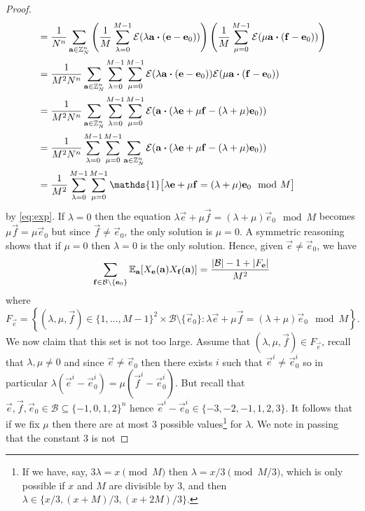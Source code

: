 \begin{proof}
\begin{align*}
	&=\frac{1}{N^{n}}\sum_{\vec{a}\in \mathbb{Z}_{N}^n}
		\left(\frac{1}{M}\sum_{\lambda=0}^{M-1}
			\mathcal{E}(\lambda\vec{a}\dotprod(\vec{e}-\vec{e}_0)
		)\right)
		\left(\frac{1}{M}\sum_{\mu=0}^{M-1}
			\mathcal{E}(\mu\vec{a}\dotprod(\vec{f}-\vec{e}_0)
		)\right)\\
	&=\frac{1}{M^2N^{n}}\sum_{\vec{a}\in \mathbb{Z}_{N}^n}
		\sum_{\lambda=0}^{M-1}\sum_{\mu=0}^{M-1}
			\mathcal{E}(\lambda\vec{a}\dotprod(\vec{e}-\vec{e}_0))
			\mathcal{E}(\mu\vec{a}\dotprod(\vec{f}-\vec{e}_0))\\
	&=\frac{1}{M^2N^{n}}\sum_{\vec{a}\in \mathbb{Z}_{N}^n}
		\sum_{\lambda=0}^{M-1}\sum_{\mu=0}^{M-1}
		\mathcal{E}(\vec{a}\dotprod(\lambda\vec{e}+\mu\vec{f}-(\lambda+\mu)\vec{e}_0))\\
	&=\frac{1}{M^2N^{n}}
		\sum_{\lambda=0}^{M-1}\sum_{\mu=0}^{M-1}
		\sum_{\vec{a}\in \mathbb{Z}_{N}^n}
		\mathcal{E}(\vec{a}\dotprod(\lambda\vec{e}+\mu\vec{f}-(\lambda+\mu)\vec{e}_0))\\
	&=\frac{1}{M^2}
		\sum_{\lambda=0}^{M-1}\sum_{\mu=0}^{M-1}
		\mathds{1}\big[
			\lambda\vec{e}+\mu\vec{f}=(\lambda+\mu)\vec{e}_0\mod{M}
			\big]
\end{align*}
by \eqref{eq:exp}.
If $\lambda=0$ then the equation $\lambda\vec{e}+\mu\vec{f}=(\lambda+\mu)\vec{e}_0\mod{M}$
becomes $\mu\vec{f}=\mu\vec{e}_0$ but since $\vec{f}\neq\vec{e}_0$, the only solution is $\mu=0$.
A symmetric reasoning shows that if $\mu=0$ then $\lambda=0$
is the only solution. Hence, given $\vec{e}\neq\vec{e}_0$, we have
\[
	\sum_{\mathbf{f}\in\mathcal{B}\setminus\{\mathbf{e}_0\}}
		\mathbb{E}_{\mathbf{a}}[X_{\mathbf{e}}(\mathbf{a})X_{\mathbf{f}}(\mathbf{a})]
		=\frac{|\mathcal{B}|-1+|F_{\mathbf{e}}|}{M^2}
\]
where
\[
	F_{\vec{e}}=\left\{(\lambda,\mu,\vec{f})\in
		\{1,\dots,M-1\}^2\times\mathcal{B}\setminus\{\vec{e}_0\}:
		\lambda\vec{e}+\mu\vec{f}=(\lambda+\mu)\vec{e}_0\mod{M
		}\right\}.
\]
We now claim that this set is not too large.
Assume that $(\lambda,\mu,\vec{f})\in F_{\vec{e}}$, recall
that $\lambda,\mu\neq0$ and
since $\vec{e}\neq\vec{e}_0$ then
there exists $i$ such that $\vec{e}^i\neq\vec{e}_0^i$ so in 
particular
$\lambda(\vec{e}^i-\vec{e}_0^i)=\mu(\vec{f}^i-\vec{e}_0^i)$.
But recall that
$\vec{e},\vec{f},\vec{e}_0\in\mathcal{B}\subseteq\{-1,0,1,2\}^n$
hence $\vec{e}^i-\vec{e}_0^i\in\{-3,-2,-1,1,2,3\}$.
It follows that if we fix $\mu$ then there are at most $3$ possible
values\footnote{If we have, say, $3\lambda=x\pmod{M}$ then
$\lambda=x/3\pmod{M/3}$, which is only possible if $x$ and $M$
are divisible by $3$, and then $\lambda\in\{x/3,(x+M)/3,(x+2M)/3\}$.}
for $\lambda$. We note in passing that the constant $3$ is not

\end{proof}
